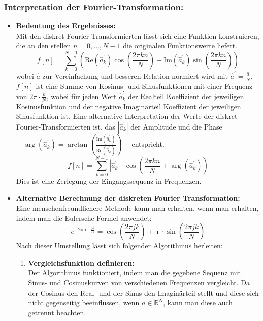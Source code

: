 \subsubsection{\textbf{Interpretation der Fourier-Transformation:}}
\begin{itemize}
	\item \textbf{Bedeutung des Ergebnisses:}\\
	Mit den diskret Fourier-Transformierten lässt sich eine Funktion konstruieren, die an den stellen \(n = 0,\dots,N-1\) die originalen Funktionswerte liefert.
	\[f[n] = \sum_{k=0}^{N-1}\left(\text{Re}(\hat{a}^\prime_k)\cos\left(\frac{2\pi kn}{N}\right)+\text{Im}(\hat{a}^\prime_k)\sin\left(\frac{2\pi kn}{N}\right)\right)\]
	wobei \(\hat{a}\) zur Vereinfachung und besseren Relation normiert wird mit \(\hat{a}^\prime = \frac{\hat{a}}{N}\).
	\(f[n]\) ist eine Summe von Kosinus- und Sinusfunktionen mit einer Frequenz von \(2\pi\cdot\frac{k}{N}\), wobei für jeden Wert \(\hat{a}^\prime_k\) der Realteil Koeffizient der jeweiligen Kosinusfunktion und der negative Imaginärteil Koeffizient der jeweiligen Sinusfunktion ist.
	Eine alternative Interpretation der Werte der diskret Fourier-Transformierten ist, das \(\left\lvert \hat{a}^\prime_k\right\rvert \) der Amplitude und die Phase \(\quad\arg(\hat{a}^\prime_k) = \arctan\left(\frac{\text{Im}(\hat{a}^\prime_k)}{\text{Re}(\hat{a}^\prime_k)}\right)\quad \) entspricht.
	\[f[n] = \sum_{k=0}^{N-1}\left\lvert\hat{a}^\prime_k\right\rvert\cdot\cos\left(\frac{2\pi kn}{N}+\arg(\hat{a}^\prime_k)\right)\]
	Dies ist eine Zerlegung der Eingangssequenz in Frequenzen.
	\item \textbf{Alternative Berechnung der diskreten Fourier Transformation:}\\
	Eine menschenfreundlichere Methode kann man erhalten, wenn man erhalten, indem man die Eulersche Formel anwendet:
	\[e^{-2\pi \imath \cdot\frac{jk}{N}} = \cos\left(\frac{2\pi jk}{N}\right) + \imath\cdot\sin\left(\frac{2\pi jk}{N}\right)\]
	Nach dieser Umstellung lässt sich folgender Algorithmus herleiten:
	\begin{enumerate}
		\item \textbf{Vergleichsfunktion definieren:}\\%
		Der Algorithmus funktioniert, indem man die gegebene Sequenz mit Sinus- und Cosinuskurven von verschiedenen Frequenzen vergleicht. Da der Cosinus den Real- und der Sinus den Imaginärteil stellt und diese sich nicht gegenseitig beeinflussen, wenn \(a \in \mathbb{R}^N\), kann man diese auch getrennt beachten.

\end{enumerate}
\end{itemize}

